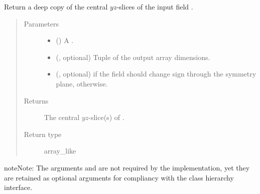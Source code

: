 \documentclass[letterpaper,10pt,english]{sphinxmanual}
\begin{document}
\begin{fulllineitems}

\begin{fulllineitems}
\label{\detokenize{api:tasmania.dycore.horizontal_boundary_relaxed.RelaxedYZ.from_computational_to_physical_domain}}
Return a deep copy of the central \(yz\)-slices of the input field .
\begin{quote}\begin{description}
\item[{Parameters}] \leavevmode\begin{itemize}
\item {} 
 () \textendash{} A .

\item {} 
 (, optional) \textendash{} Tuple of the output array dimensions.

\item {} 
 (, optional) \textendash{}  if the field should change sign through the symmetry plane,  otherwise.

\end{itemize}

\item[{Returns}] \leavevmode
The central \(yz\)-slice(s) of .

\item[{Return type}] \leavevmode
array\_like

\end{description}\end{quote}

\begin{sphinxadmonition}{note}{Note:}
The arguments  and  are not required by the implementation,
yet they are retained as optional arguments for compliancy with the class hierarchy interface.
\end{sphinxadmonition}

\end{fulllineitems}


\end{fulllineitems}
\end{document}
